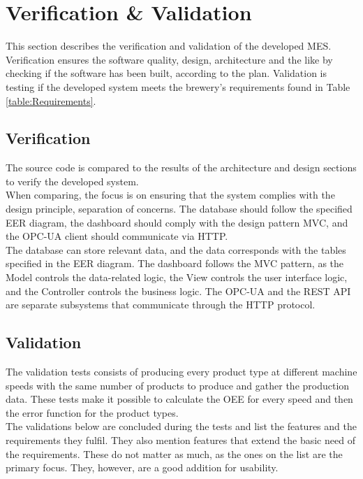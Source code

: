 \section{Verification \& Validation}
This section describes the verification and validation of the developed MES.\\

Verification ensures the software quality, design, architecture and the like by
checking if the software has been built, according to the plan. Validation is
testing if the developed system meets the brewery's requirements found in Table
\ref{table:Requirements}.

\subsection{Verification}
The source code is compared to the results of the architecture and design
sections to verify the developed system. \\

When comparing, the focus is on ensuring that the system complies with the
design principle, separation of concerns. The database should follow the
specified EER diagram, the dashboard should comply with the design pattern MVC,
and the OPC-UA client should communicate via HTTP. \\

The database can store relevant data, and the data corresponds with the tables
specified in the EER diagram. The dashboard follows the MVC pattern, as the
Model controls the data-related logic, the View controls the user interface
logic, and the Controller controls the business logic. The OPC-UA and the REST
API are separate subsystems that communicate through the HTTP protocol. 


\subsection{Validation}
The validation tests consists of producing every product type at different
machine speeds with the same number of products to produce and gather the
production data. These tests make it possible to calculate the OEE for every
speed and then the error function for the product types.\\

The validations below are concluded during the tests and list the features and
the requirements they fulfil. They also mention features that extend the basic
need of the requirements. These do not matter as much, as the ones on the list
are the primary focus. They, however, are a good addition for usability.

